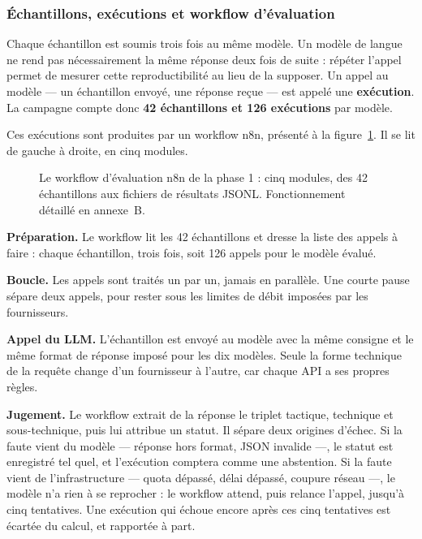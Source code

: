 \subsubsection{Échantillons, exécutions et workflow d'évaluation}\label{sec:1-5}
Chaque échantillon est soumis trois fois au même modèle. Un modèle de langue ne rend pas nécessairement la même réponse deux fois de suite : répéter l'appel permet de mesurer cette reproductibilité au lieu de la supposer. Un appel au modèle --- un échantillon envoyé, une réponse reçue --- est appelé une \textbf{exécution}. La campagne compte donc \textbf{42 échantillons et 126 exécutions} par modèle.

Ces exécutions sont produites par un workflow n8n, présenté à la figure~\ref{fig:workflow-eval}. Il se lit de gauche à droite, en cinq modules.

\begin{figure}[htbp]
\centering
{}
\caption{Le workflow d'évaluation n8n de la phase 1 : cinq modules, des 42 échantillons aux fichiers de résultats JSONL. Fonctionnement détaillé en annexe~B.}\label{fig:workflow-eval}
\end{figure}

\textbf{Préparation.} Le workflow lit les 42 échantillons et dresse la liste des appels à faire : chaque échantillon, trois fois, soit 126 appels pour le modèle évalué.

\textbf{Boucle.} Les appels sont traités un par un, jamais en parallèle. Une courte pause sépare deux appels, pour rester sous les limites de débit imposées par les fournisseurs.

\textbf{Appel du LLM.} L'échantillon est envoyé au modèle avec la même consigne et le même format de réponse imposé pour les dix modèles. Seule la forme technique de la requête change d'un fournisseur à l'autre, car chaque API a ses propres règles.

\textbf{Jugement.} Le workflow extrait de la réponse le triplet tactique, technique et sous-technique, puis lui attribue un statut. Il sépare deux origines d'échec. Si la faute vient du modèle --- réponse hors format, JSON invalide ---, le statut est enregistré tel quel, et l'exécution comptera comme une abstention. Si la faute vient de l'infrastructure --- quota dépassé, délai dépassé, coupure réseau ---, le modèle n'a rien à se reprocher : le workflow attend, puis relance l'appel, jusqu'à cinq tentatives. Une exécution qui échoue encore après ces cinq tentatives est écartée du calcul, et rapportée à part.

